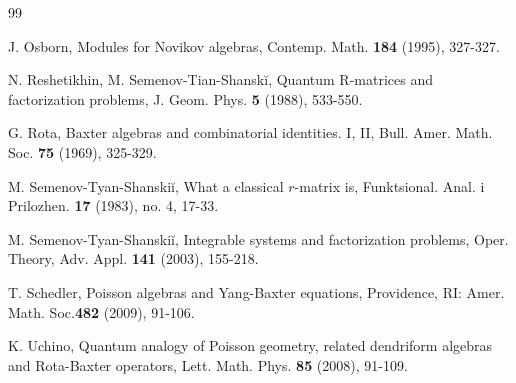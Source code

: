 \documentclass[12pt]{amsart}
\begin{document}
\begin{thebibliography}{99}



J. Osborn, Modules for Novikov algebras, %
Contemp. Math. {\bf184} (1995), 327-327.









N. Reshetikhin, M. Semenov-Tian-Shansk\u i, Quantum R-matrices and
factorization problems, J. Geom. Phys. {\bf 5} (1988), 533-550.

G. Rota, Baxter algebras and combinatorial identities. I, II, Bull. Amer. Math. Soc. {\bf 75} (1969), 325-329.

M. Semenov-Tyan-Shanski\u i, What a classical $r$-matrix is,
Funktsional. Anal. i Prilozhen. {\bf 17} (1983), no. 4, 17-33.

M. Semenov-Tyan-Shanski\u i, Integrable systems and factorization
problems, Oper. Theory, Adv. Appl. {\bf 141} (2003), 155-218.

T. Schedler, Poisson algebras and Yang-Baxter equations,
Providence, RI: Amer. Math. Soc.{\bf 482} (2009), 91-106.

K. Uchino,  Quantum analogy of Poisson geometry, related
dendriform algebras and Rota-Baxter operators, Lett. Math. Phys.
{\bf 85} (2008), 91-109.


\end{thebibliography}
\end{document}
